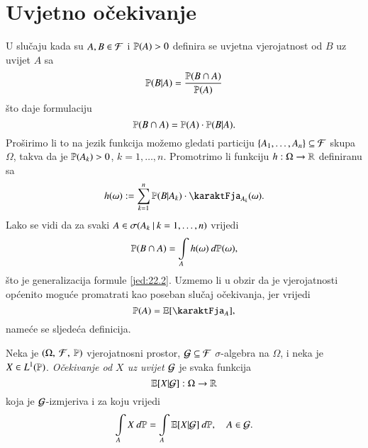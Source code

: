 
\chapter{Uvjetno o\v cekivanje}

U slu\v caju kada su $A, B \in \mathcal{F}$ i $\mathbb{P} (A) > 0$ definira se uvjetna vjerojatnost od $B$ uz uvijet $A$ sa
\begin{equation}    \label{jed:22.1}
    \mathbb{P} (B | A) = \frac{\mathbb{P} (B \cap A)}{\mathbb{P} (A)}
\end{equation}
\v sto daje formulaciju
\begin{equation}    \label{jed:22.2}
    \mathbb{P} (B \cap A) = \mathbb{P} (A) \cdot \mathbb{P} (B | A).
\end{equation}
Pro\v sirimo li to na jezik funkcija mo\v zemo gledati particiju $\{A_1, \ldots, A_n\} \subseteq \mathcal{F}$ skupa $\Omega$, takva da je $\mathbb{P} (A_k) > 0$, $k = 1, \ldots, n$.
Promotrimo li funkciju $h : \Omega \to \mathbb{R}$ definiranu sa
\begin{equation}    \label{jed:22.3}
    h (\omega) := \suma{k = 1}{n} \masP (B | A_k) \cdot \karaktFja_{A_k} (\omega).
\end{equation}
Lako se vidi da za svaki $A \in \sigma({A_k} \: | \: {k = 1, \ldots, n})$ vrijedi
\begin{equation}    \label{jed:22.4}
    \mathbb{P} (B \cap A) = \int\limits_A h (\omega) \: d \mathbb{P} (\omega),
\end{equation}
\v sto je generalizacija formule \eqref{jed:22.2}.
Uzmemo li u obzir da je vjerojatnosti op\' cenito mogu\' ce promatrati kao poseban slu\v caj o\v cekivanja, jer vrijedi
\begin{equation*}
    \masP (A) = \masE [ \karaktFja_A ],
\end{equation*}
name\' ce se sljede\' ca definicija.

\begin{defn}    \label{defn:22.5}
    Neka je $(\Omega, \: \mathcal{F}, \: \mathbb{P})$ vjerojatnosni prostor, $\mathcal{G} \subseteq \mathcal{F}$ $\sigma$-algebra na $\Omega$, i neka je $X \in L^1 (\mathbb{P})$.
    \emph{O\v cekivanje od $X$ uz uvijet $\mathcal{G}$} je svaka funkcija
    \begin{equation*}
        \mathbb{E} [X | \mathcal{G}] : \Omega \to \mathbb{R}
    \end{equation*}
    koja je $\mathcal{G}$-izmjeriva i za koju vrijedi
    \begin{equation*}
        \int\limits_A X \: d \mathbb{P} = \int\limits_A \mathbb{E} [X | \mathcal{G}] \: d \mathbb{P}, \quad A \in \mathcal{G}.
    \end{equation*}
\end{defn}

